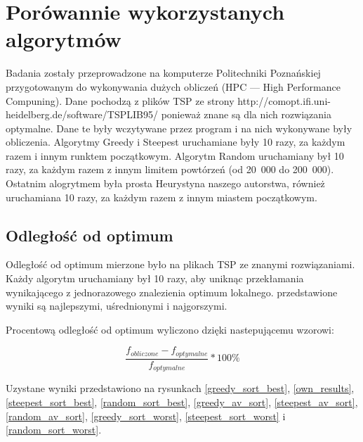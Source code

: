 \section{Porówannie wykorzystanych algorytmów}

Badania zostały przeprowadzone na komputerze Politechniki Poznańskiej przygotowanym do 
wykonywania dużych obliczeń (HPC --- High Performance Compuning). Dane pochodzą z plików
TSP ze strony http://comopt.ifi.uni-heidelberg.de/software/TSPLIB95/ ponieważ znane są dla
nich rozwiązania optymalne. Dane te były wczytywane przez program i na nich wykonywane były 
obliczenia. Algorytmy Greedy i Steepest uruchamiane były 10 razy, za każdym razem i innym 
runktem początkowym. Algorytm Random uruchamiany był 10 razy, za każdym razem z innym 
limitem powtórzeń (od 20~000 do 200~000). Ostatnim alogrytmem była prosta Heurystyna naszego
autorstwa, również uruchamiana 10 razy, za każdym razem z innym miastem początkowym.

\subsection{Odległość od optimum}

Odległość od optimum mierzone było na plikach TSP ze znanymi rozwiązaniami. Każdy algorytm 
uruchamiany był 10 razy, aby uniknąc przekłamania wynikającego z jednorazowego znalezienia 
optimum lokalnego. przedstawione wyniki są najlepszymi, uśrednionymi i najgorszymi.

Procentową odległość od optimum wyliczono dzięki nastepującemu wzorowi:

$$ \frac{f_{obliczone} - f_{optymalne}}{f_{optymalne}} * 100 \% $$


Uzystane wyniki przedstawiono na rysunkach \ref{greedy_sort_best}, \ref{own_results}, \ref{steepest_sort_best}, 
\ref{random_sort_best}, \ref{greedy_av_sort},  \ref{steepest_av_sort}, 
\ref{random_av_sort}, \ref{greedy_sort_worst},
\ref{steepest_sort_worst} i
\ref{random_sort_worst}.

